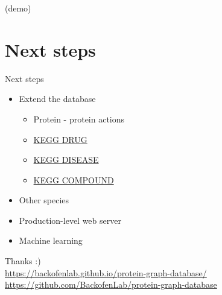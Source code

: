 \documentclass{beamer}
\begin{document}

\begin{frame}
\centering
\huge{(demo)}
\end{frame}

\section{Next steps}
\begin{frame}{Next steps}
\begin{itemize}
    \item Extend the database
    \begin{itemize}
        \item Protein - protein actions
        \item \href{https://www.genome.jp/kegg/drug/}{KEGG DRUG}
        \item \href{https://www.genome.jp/kegg/disease/}{KEGG DISEASE}
        \item \href{https://www.genome.jp/kegg/compound/}{KEGG COMPOUND}
    \end{itemize}
    \vfill
    \item Other species
    \vfill
    \item Production-level web server
    \vfill
    \item Machine learning
\end{itemize}
\end{frame}

\begin{frame}
\centering
\huge{Thanks :)}
\bigskip \\
\small{
    \href{https://backofenlab.github.io/protein-graph-database/}{https://backofenlab.github.io/protein-graph-database/} \\
    \href{https://github.com/BackofenLab/protein-graph-database}{https://github.com/BackofenLab/protein-graph-database}
}
\end{frame}
\end{document}

